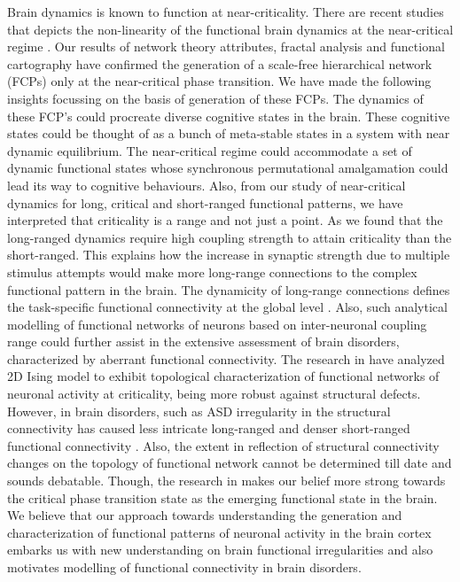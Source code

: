 \documentclass[preprintnumbers,amsmath,amssymb,onecolumn]{revtex4}
\begin{document}
{\noindent} Brain dynamics is known to function at near-criticality. There are recent studies that depicts the non-linearity of the functional brain dynamics at the near-critical regime \citep{Tagliazucchi2016, Cocchi2017, Ezaki2020}. Our results of network theory attributes, fractal analysis and functional cartography have confirmed the generation of a scale-free hierarchical network (FCPs) only at the near-critical phase transition. We have made the following insights focussing on the basis of generation of these FCPs. The dynamics of these FCP's could procreate diverse cognitive states in the brain. These cognitive states could be thought of as a bunch of meta-stable states in a system with near dynamic equilibrium. The near-critical regime could accommodate a set of dynamic functional states whose synchronous permutational amalgamation could lead its way to cognitive behaviours. Also, from our study of near-critical dynamics for long, critical and short-ranged functional patterns, we have interpreted that criticality is a range and not just a point. As we found that the long-ranged dynamics require high coupling strength to attain criticality than the short-ranged. This explains how the increase in synaptic strength due to multiple stimulus attempts would make more long-range connections to the complex functional pattern in the brain. The dynamicity of long-range connections defines the task-specific functional connectivity at the global level \citep{Park2013}. Also, such analytical {modelling} of functional networks of neurons based on inter-neuronal coupling range could further assist in the extensive assessment of brain disorders, characterized by aberrant functional connectivity. The research in \citep{goodarzinick2018} have analyzed 2D Ising model to exhibit topological characterization of functional networks of neuronal activity at criticality, being more robust against structural defects. However, in brain disorders, such as ASD irregularity in the structural connectivity has caused less intricate long-ranged and denser short-ranged functional connectivity \citep{Conti2017}. Also, the extent in reflection of structural connectivity changes on the topology of functional network cannot be determined till date and sounds debatable. Though, the research in \citep{goodarzinick2018} makes our belief more strong towards the critical phase transition state as the emerging functional state in the brain. We believe that our approach towards understanding the generation and characterization of functional patterns of neuronal activity in the brain cortex embarks us with new understanding on brain functional irregularities and also motivates modelling of functional connectivity in brain disorders.\\
\end{document}
